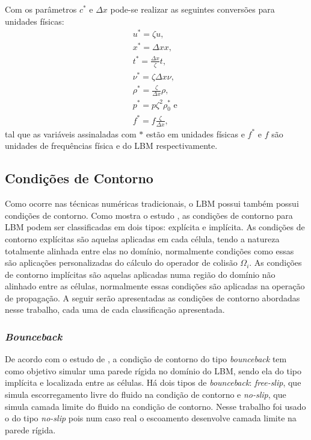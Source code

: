Com os parâmetros $c^{*}$ e $\Delta x$ pode-se realizar as seguintes conversões para unidades físicas:
\begin{gather*}
	\textbf{$u^{*}$} = \zeta \textbf{$u$}\text{, } \\ \textbf{$x^{*}$} = \Delta x\textbf{$x$}
	\text{, } \\ t^{*} = \frac{\Delta x}{\zeta}t \text{, } \\ \nu^{*} = \zeta \Delta x \nu
	\text{, } \\ \rho^{*} = \frac{\zeta}{\Delta x} \rho \text{, } \\ p^{*} = p \zeta^{2}  \rho^{*}_{0} \text{ e } \\ f^{*} = f\frac{\zeta}{\Delta x},
    \label{eq:conversao_1}
\end{gather*}
tal que as variáveis assinaladas com $*$ estão em unidades físicas e $f^{*}$ e $f$ são unidades de frequências física e do LBM respectivamente.

\subsection{Condições de Contorno}

Como ocorre nas técnicas numéricas tradicionais, o LBM possui também possui condições de contorno. Como mostra o estudo , as condições de contorno para LBM podem ser classificadas em dois tipos: explícita e implícita. As condições de contorno explícitas são aquelas aplicadas em cada célula, tendo a natureza totalmente alinhada entre elas no domínio, normalmente condições como essas são aplicações personalizadas do cálculo do operador de colisão $\Omega_{i}$. As condições de contorno implícitas são aquelas aplicadas numa região do domínio não alinhado entre as células, normalmente essas condições são aplicadas na operação de propagação. A seguir serão apresentadas as condições de contorno abordadas nesse trabalho, cada uma de cada classificação apresentada.

\subsubsection{\textit{Bounceback}}

De acordo com o estudo de , a condição de contorno do tipo \textit{bounceback} tem como objetivo simular uma parede rígida no domínio do LBM, sendo ela do tipo implícita e localizada entre as células. Há dois tipos de \textit{bounceback}: \textit{free-slip}, que simula escorregamento livre do fluido na condição de contorno e \textit{no-slip}, que simula camada limite do fluido na condição de contorno. Nesse trabalho foi usado o do tipo \textit{no-slip} pois num caso real o escoamento desenvolve camada limite na parede rígida.

